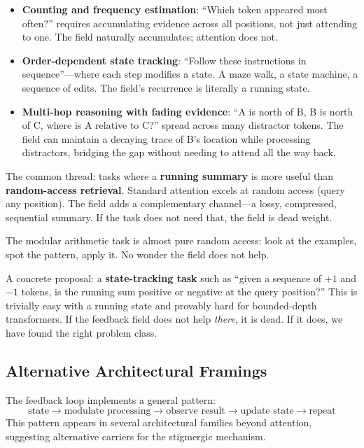 \documentclass[11pt,a4paper]{article}
\begin{document}
\begin{itemize}
    \item \textbf{Counting and frequency estimation}: ``Which token
          appeared most often?'' requires accumulating evidence across
          all positions, not just attending to one. The field naturally
          accumulates; attention does not.

    \item \textbf{Order-dependent state tracking}: ``Follow these
          instructions in sequence''---where each step modifies a
          state. A maze walk, a state machine, a sequence of edits.
          The field's recurrence is literally a running state.

    \item \textbf{Multi-hop reasoning with fading evidence}: ``A is
          north of B, B is north of C, where is A relative to C?''
          spread across many distractor tokens. The field can maintain
          a decaying trace of B's location while processing
          distractors, bridging the gap without needing to attend all
          the way back.
\end{itemize}

The common thread: tasks where a \textbf{running summary} is more
useful than \textbf{random-access retrieval}. Standard attention
excels at random access (query any position). The field adds a
complementary channel---a lossy, compressed, sequential summary. If
the task does not need that, the field is dead weight.

The modular arithmetic task is almost pure random access: look at the
examples, spot the pattern, apply it. No wonder the field does not
help.

A concrete proposal: a \textbf{state-tracking task} such as ``given a
sequence of $+1$ and $-1$ tokens, is the running sum positive or
negative at the query position?'' This is trivially easy with a
running state and provably hard for bounded-depth transformers. If
the feedback field does not help \emph{there}, it is dead. If it
does, we have found the right problem class.

\subsection{Alternative Architectural Framings}
\label{sec:alt_arch}

The feedback loop implements a general pattern:
\begin{equation*}
    \text{state} \to \text{modulate processing} \to \text{observe result}
    \to \text{update state} \to \text{repeat}
\end{equation*}
This pattern appears in several architectural families beyond
attention, suggesting alternative carriers for the stigmergic
mechanism.
\end{document}
